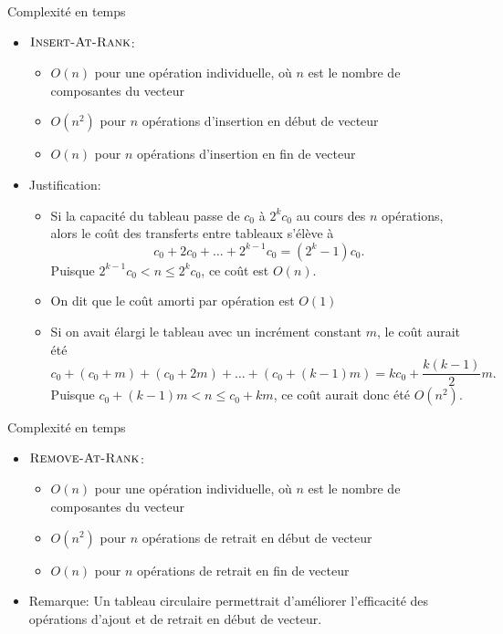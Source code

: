 \begin{frame}{Complexité en temps}\label{sec04:amortie}
\begin{itemize}
\item $\textnormal{\scshape Insert-At-Rank}$:
\begin{itemize}
\item $O(n)$ pour une opération individuelle, où $n$ est le nombre de composantes du vecteur
\item $O(n^2)$ pour $n$ opérations d'insertion en \alert{début} de vecteur
\item $O(n)$ pour $n$ opérations d'insertion en \alert{fin} de vecteur
\end{itemize}
\item Justification:
\begin{itemize}
\item Si la capacité du tableau passe de $c_0$ à $2^k c_0$ au cours des $n$ opérations, alors le coût des transferts entre tableaux s'élève à
$$c_0+2 c_0+\ldots+2^{k-1} c_0=(2^k-1) c_0.$$
Puisque $2^{k-1} c_0 < n \leq 2^k c_0$, ce coût est \alert{$O(n)$}.
\item On dit que le \alert{coût amorti} par opération est $O(1)$
\item Si on avait élargi le tableau avec un incrément constant $m$, le coût aurait été
$$c_0+(c_0+m)+(c_0+2m)+\ldots+(c_0+(k-1)m)=kc_0+\frac{k(k-1)}{2}m.$$
Puisque $c_0+(k-1)m<n\leq c_0+km$, ce coût aurait donc été \alert{$O(n^2)$}.
\end{itemize}
\end{itemize}
\end{frame}

\begin{frame}{Complexité en temps}
\begin{itemize}
\item $\textnormal{\scshape Remove-At-Rank}$:
\begin{itemize}
\item $O(n)$ pour une opération individuelle, où $n$ est le nombre de composantes du vecteur
\item $O(n^2)$ pour $n$ opérations de retrait en \alert{début} de vecteur
\item $O(n)$ pour $n$ opérations de retrait en \alert{fin} de vecteur
\end{itemize}
\item Remarque: Un tableau circulaire permettrait d'améliorer l'efficacité des opérations d'ajout et de retrait en début de vecteur.
\end{itemize}

\end{frame}

